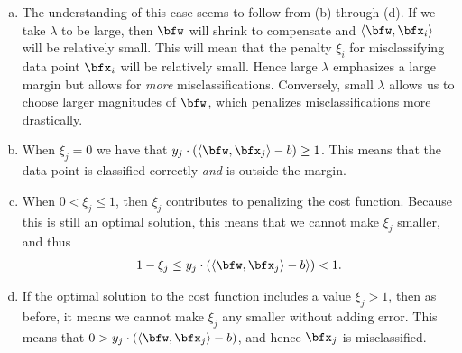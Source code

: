 \begin{homework}[e]
\begin{enumerate}[(a)]
    \end{enumerate}
  \begin{prf}$ $
    \begin{enumerate}[(a)]
      \item The understanding of this case seems to follow from (b) through (d). If we take $\lambda$ to be large, then $\bfw$ will shrink to compensate and $\langle \bfw,\bfx_i \rangle$ will be relatively small. This will mean that the penalty $\xi_i$ for misclassifying data point $\bfx_i$ will be relatively small. Hence large $\lambda$ emphasizes a large margin but allows for \emph{more} misclassifications. Conversely, small $\lambda$ allows us to choose larger magnitudes of $\bfw$, which penalizes misclassifications more drastically.
      \item When $\xi_j = 0$ we have that $y_j\cdot (\langle \bfw,\bfx_j \rangle - b)\geq 1$. This means that the data point is classified correctly \emph{and} is outside the margin.
      \item When $0 < \xi_j \leq 1$, then $\xi_j$ contributes to penalizing the cost function. Because this is still an optimal solution, this means that we cannot make $\xi_j$ smaller, and thus
        \begin{align*}
          1 - \xi_j \leq y_j\cdot(\langle \bfw,\bfx_j\rangle - b \rangle) < 1.
        \end{align*}
      \item If the optimal solution to the cost function includes a value $\xi_j > 1$, then as before, it means we cannot make $\xi_j$ any smaller without adding error. This means that $0 > y_j\cdot (\langle \bfw,\bfx_j \rangle - b)$, and hence $\bfx_j$ is misclassified.
    \end{enumerate}
  \end{prf}
\end{homework}
\newpage
